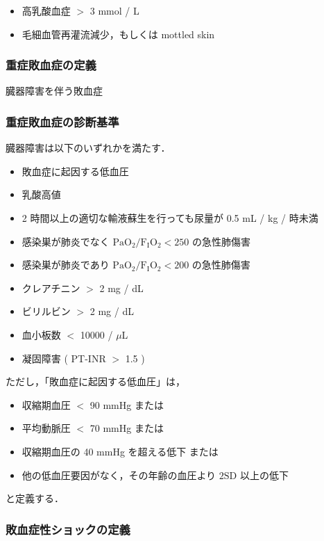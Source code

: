 \documentclass[10pt,uplatex]{jsarticle}
\begin{document}
\begin{itemize}
\item 高乳酸血症 $>$ 3 mmol / L
\item 毛細血管再灌流減少，もしくは mottled skin
\end{itemize}

\subsubsection{重症敗血症の定義}

臓器障害を伴う敗血症

\subsubsection{重症敗血症の診断基準}

臓器障害は以下のいずれかを満たす．

\begin{itemize}
\item 敗血症に起因する低血圧
\item 乳酸高値
\item 2 時間以上の適切な輸液蘇生を行っても尿量が 0.5 mL / kg / 時未満
\item 感染巣が肺炎でなく $\mathrm{PaO}_2 / \mathrm{F_IO_2} < 250$ の急性肺傷害
\item 感染巣が肺炎であり $\mathrm{PaO}_2 / \mathrm{F_IO_2} < 200$ の急性肺傷害
\item クレアチニン $>$ 2 mg / dL
\item ビリルビン $>$ 2 mg / dL
\item 血小板数 $<$ 10000 / $\mu$L
\item 凝固障害 ( PT-INR $>$ 1.5 )
\end{itemize}

ただし，「敗血症に起因する低血圧」は，

\begin{itemize}
\item 収縮期血圧 $<$ 90 mmHg または
\item 平均動脈圧 $<$ 70 mmHg または
\item 収縮期血圧の 40 mmHg を超える低下 または
\item 他の低血圧要因がなく，その年齢の血圧より $2\mathrm{SD}$ 以上の低下
\end{itemize}

と定義する．

\subsubsection{敗血症性ショックの定義}
\end{document}
